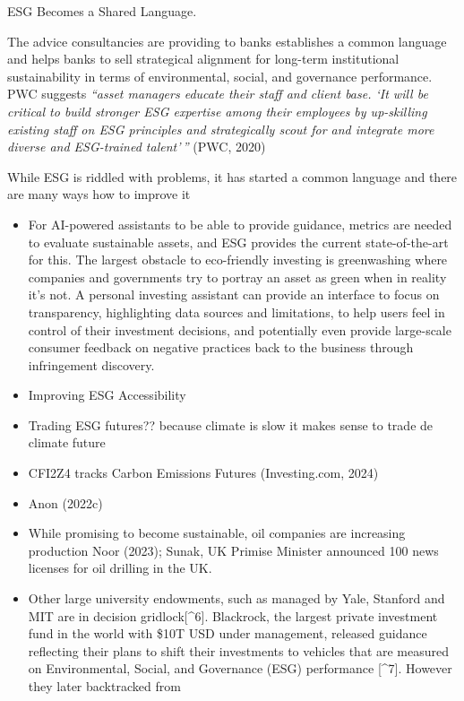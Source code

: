 \documentclass[
  letterpaper,
  DIV=11,
  numbers=noendperiod]{scrartcl}
\begin{document}
ESG Becomes a Shared Language.

The advice consultancies are providing to banks establishes a common
language and helps banks to sell strategical alignment for long-term
institutional sustainability in terms of environmental, social, and
governance performance. PWC suggests \emph{``asset managers educate
their staff and client base. `It will be critical to build stronger ESG
expertise among their employees by up-skilling existing staff on ESG
principles and strategically scout for and integrate more diverse and
ESG-trained talent'\,''} (PWC, 2020)

While ESG is riddled with problems, it has started a common language and
there are many ways how to improve it

\begin{itemize}
\item
  For AI-powered assistants to be able to provide guidance, metrics are
  needed to evaluate sustainable assets, and ESG provides the current
  state-of-the-art for this. The largest obstacle to eco-friendly
  investing is greenwashing where companies and governments try to
  portray an asset as green when in reality it's not. A personal
  investing assistant can provide an interface to focus on transparency,
  highlighting data sources and limitations, to help users feel in
  control of their investment decisions, and potentially even provide
  large-scale consumer feedback on negative practices back to the
  business through infringement discovery.
\item
  Improving ESG Accessibility
\item
  Trading ESG futures?? because climate is slow it makes sense to trade
  de climate future
\item
  CFI2Z4 tracks Carbon Emissions Futures (Investing.com, 2024)
\item
  Anon (2022c)
\item
  While promising to become sustainable, oil companies are increasing
  production Noor (2023); Sunak, UK Primise Minister announced 100 news
  licenses for oil drilling in the UK.
\item
  Other large university endowments, such as managed by Yale, Stanford
  and MIT are in decision gridlock{[}\^{}6{]}. Blackrock, the largest
  private investment fund in the world with \$10T USD under management,
  released guidance reflecting their plans to shift their investments to
  vehicles that are measured on Environmental, Social, and Governance
  (ESG) performance {[}\^{}7{]}. However they later backtracked from

\end{itemize}
\end{document}
